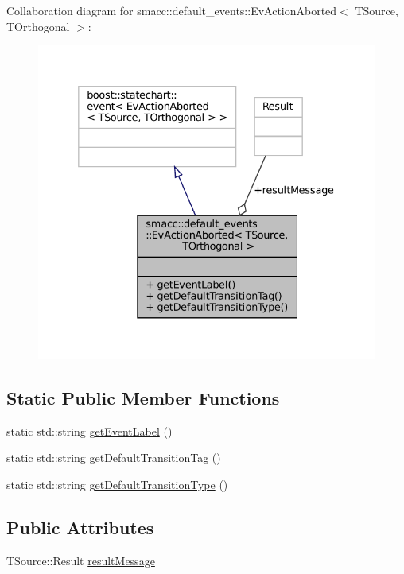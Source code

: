 Collaboration diagram for smacc\+:\+:default\+\_\+events\+:\+:Ev\+Action\+Aborted$<$ T\+Source, T\+Orthogonal $>$\+:
\nopagebreak
\begin{figure}[H]
\begin{center}
\leavevmode
\includegraphics[width=332pt]{structsmacc_1_1default__events_1_1EvActionAborted__coll__graph}
\end{center}
\end{figure}
\subsection*{Static Public Member Functions}
\begin{DoxyCompactItemize}
\item 
static std\+::string \hyperlink{structsmacc_1_1default__events_1_1EvActionAborted_ad30b3aabae46c54eb4ee9944d6427a56}{get\+Event\+Label} ()
\item 
static std\+::string \hyperlink{structsmacc_1_1default__events_1_1EvActionAborted_a989f288bf3ad9a7ea6acbef46bb77444}{get\+Default\+Transition\+Tag} ()
\item 
static std\+::string \hyperlink{structsmacc_1_1default__events_1_1EvActionAborted_a6ad077f5908f46974c09a53cd27ef48e}{get\+Default\+Transition\+Type} ()
\end{DoxyCompactItemize}
\subsection*{Public Attributes}
\begin{DoxyCompactItemize}
\item 
T\+Source\+::\+Result \hyperlink{structsmacc_1_1default__events_1_1EvActionAborted_a542b6df003c242f61775aa1d8921d945}{result\+Message}
\end{DoxyCompactItemize}


